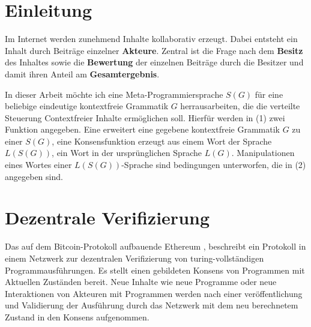 \documentclass[]{article}
\author{}
\date{}
\begin{document}
\tableofcontents


\newpage

\section{Einleitung}

Im Internet werden zunehmend Inhalte kollaborativ erzeugt. 
Dabei entsteht ein Inhalt durch Beiträge einzelner \textbf{Akteure}.
Zentral ist die Frage nach dem \textbf{Besitz} des Inhaltes sowie die \textbf{Bewertung} der einzelnen Beiträge durch die Besitzer und damit ihren Anteil am \textbf{Gesamtergebnis}. 






In dieser Arbeit möchte ich eine Meta-Programmiersprache
\textbf{$S(G)$} für eine beliebige eindeutige kontextfreie Grammatik
$G$ herrausarbeiten, die die verteilte Steuerung Contextfreier Inhalte ermöglichen soll.
Hierfür werden in (1) zwei Funktion angegeben. Eine erweitert eine
gegebene kontextfreie Grammatik $G$ zu einer $S(G)$, eine Konsensfunktion erzeugt aus einem Wort der Sprache $L(S(G))$, ein Wort in der ursprünglichen Sprache
$L(G)$. Manipulationen eines Wortes einer $L(S(G))$-Sprache sind bedingungen
unterworfen, die in (2) angegeben sind.


\newpage





\section{Dezentrale Verifizierung}

Das auf dem Bitcoin-Protokoll aufbauende Ethereum \cite{Wood2014}, beschreibt ein Protokoll in einem Netzwerk zur dezentralen Verifizierung von turing-vollständigen Programmausführungen. 
Es stellt einen gebildeten Konsens von Programmen mit Aktuellen Zuständen bereit. 
Neue Inhalte wie neue Programme oder neue Interaktionen von Akteuren mit Programmen werden nach einer veröffentlichung und Validierung der Ausführung durch das Netzwerk mit dem neu berechnetem Zustand in den Konsens aufgenommen.
\end{document}
